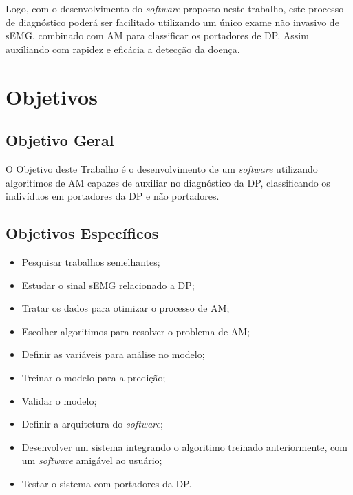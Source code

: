 Logo, com o desenvolvimento do \textit{software} proposto neste trabalho, este processo de diagnóstico poderá ser facilitado utilizando um único exame não invasivo de sEMG, combinado com AM para classificar os portadores de DP. Assim auxiliando com rapidez e eficácia a detecção da doença. 

\section{Objetivos} 
\subsection{Objetivo Geral} 
O Objetivo deste Trabalho é o desenvolvimento de um \textit{software} utilizando algoritimos de AM capazes de auxiliar no diagnóstico da DP, classificando os indivíduos em portadores da DP e não portadores. 

\subsection{Objetivos Específicos}
\begin{itemize}
    \item Pesquisar trabalhos semelhantes;
    \item Estudar o sinal sEMG relacionado a DP;
    \item Tratar os dados para otimizar o processo de AM;
    \item Escolher algoritimos para resolver o problema de AM;
    \item Definir as variáveis para análise no modelo;
    \item Treinar o modelo para a predição;
    \item Validar o modelo;
    \item Definir a arquitetura do \textit{software};
    \item Desenvolver um sistema integrando o algoritimo treinado anteriormente, com um \textit{software} amigável ao usuário;
    \item Testar o sistema com portadores da DP.
\end{itemize}